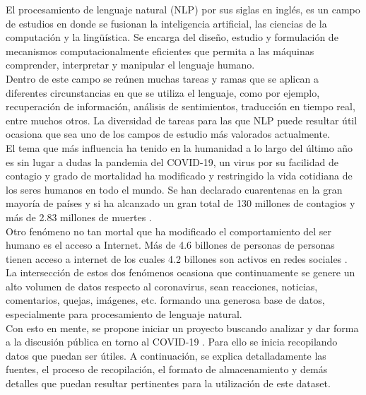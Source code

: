 El procesamiento de lenguaje natural (NLP) por sus siglas en inglés, es un campo de estudios en donde se fusionan la inteligencia artificial, las ciencias de la computación y la lingüística. Se encarga del diseño, estudio y formulación de mecanismos computacionalmente eficientes que permita a las máquinas comprender, interpretar y manipular el lenguaje humano.\\

Dentro de este campo se reúnen muchas tareas y ramas que se aplican a diferentes circunstancias en que se utiliza el lenguaje, como por ejemplo, recuperación de información, análisis de sentimientos, traducción en tiempo real, entre muchos otros. La diversidad de tareas para las que NLP puede resultar útil ocasiona que sea uno de los campos de estudio más valorados actualmente.\\

El tema que más influencia ha tenido en la humanidad a lo largo del último año es sin lugar a dudas la pandemia del COVID-19, un virus por su facilidad de contagio y grado de mortalidad ha modificado y restringido la vida cotidiana de los seres humanos en todo el mundo.
Se han declarado cuarentenas en la gran mayoría de países y si ha alcanzado un gran total de 130 millones de contagios y más de 2.83 millones de muertes \cite{WorldMeter}.\\

Otro fenómeno no tan mortal que ha modificado el comportamiento del ser humano es el acceso a Internet. Más de 4.6 billones de personas de personas tienen acceso a internet de los cuales 4.2 billones son activos en redes sociales \cite{SocialNetworks}. La intersección de estos dos fenómenos ocasiona que continuamente se genere un alto volumen de datos respecto al coronavirus, sean reacciones, noticias, comentarios, quejas, imágenes, etc. formando una generosa base de datos, especialmente para procesamiento de lenguaje natural.\\

Con esto en mente, se propone iniciar un proyecto buscando analizar y dar forma a la discusión pública en torno al COVID-19 . Para ello se inicia recopilando datos que puedan ser útiles. A continuación, se explica detalladamente las fuentes, el proceso de recopilación, el formato de almacenamiento y demás detalles que puedan resultar pertinentes para la utilización de este dataset.
